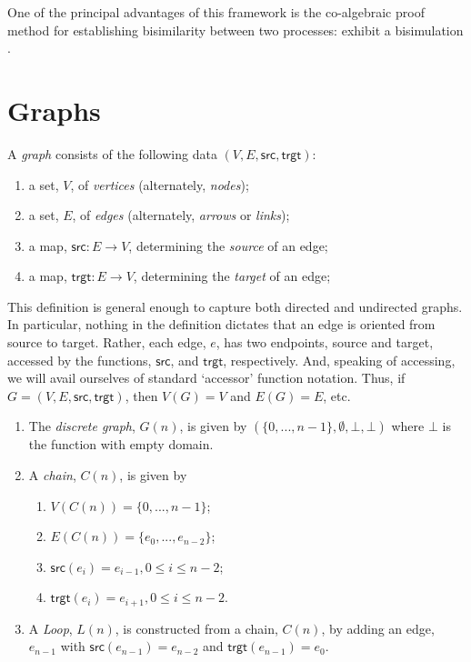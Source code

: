 \documentclass[]{llncs}
\begin{document}
One of the principal advantages of this framework is the co-algebraic
proof method for establishing bisimilarity between two processes:
exhibit a bisimulation \cite{DBLP:conf/lics/Sangiorgi04}.

\section{Graphs}

\begin{definition}
  A \emph{graph} consists of the following data $(V,E,\textsf{src},\textsf{trgt})$:
  \begin{enumerate}
    \item a set, $V$, of \emph{vertices} (alternately, \emph{nodes});
    \item a set, $E$, of \emph{edges} (alternately, \emph{arrows} or \emph{links});
    \item a map, $\textsf{src}:E \to V$, determining the \emph{source} of an edge;
    \item a map, $\textsf{trgt}:E \to V$, determining the \emph{target} of an edge;
  \end{enumerate}
\end{definition}

This definition is general enough to capture both directed and
undirected graphs. In particular, nothing in the definition dictates
that an edge is oriented from source to target. Rather, each edge,
$e$, has two endpoints, source and target, accessed by the functions,
$\textsf{src}$, and $\textsf{trgt}$, respectively. And, speaking of
accessing, we will avail ourselves of standard `accessor' function
notation. Thus, if $G = (V,E,\textsf{src},\textsf{trgt})$, then $V(G)
= V$ and $E(G) = E$, etc.

\begin{example} \label{seqex}
  \begin{enumerate}
  \item The \emph{discrete graph}, $G(n)$, is given by
  $(\{0,...,n-1\},\emptyset,\bot,\bot)$ where $\bot$ is the function
  with empty domain.

  \item A \emph{chain}, $C(n)$, is given by 
  \begin{enumerate}
    \item $V(C(n)) = \{0,...,n-1\}$;
    \item $E(C(n)) = \{e_0,...,e_{n-2}\}$;
    \item $\textsf{src}(e_i)=e_{i-1}, 0 \leq i \leq n-2$;
    \item $\textsf{trgt}(e_i)=e_{i+1},0 \leq i \leq n-2$.
  \end{enumerate}

  \item A \emph{Loop}, $L(n)$, is constructed from a chain,
  $C(n)$, by adding an edge, $e_{n-1}$ with
  $\textsf{src}(e_{n-1})=e_{n-2}$ and $\textsf{trgt}(e_{n-1})=e_{0}$.
  \end{enumerate}
\end{example}
\end{document}
